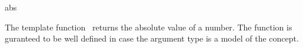 \begin{ccRefFunction}{abs}

\ccDefinition

The template function \ccRefName\ returns the absolute value of a number.
The function is guranteed to be well defined in case the argument type 
is a model of the  concept. 



\ccSeeAlso
{} \\
\\
 
\end{ccRefFunction}
